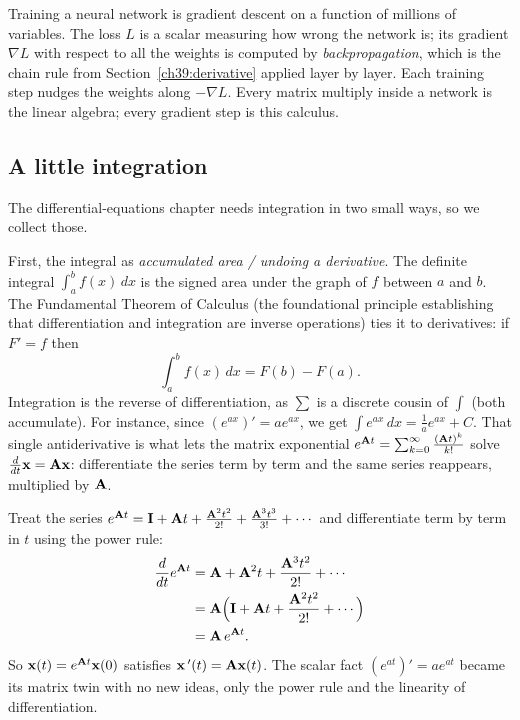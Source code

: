 \begin{applicationbox}
Training a neural network is gradient descent on a function of millions of variables. The loss $L$ is
a scalar measuring how wrong the network is; its gradient $\nabla L$ with respect to all the weights
is computed by \emph{backpropagation}, which is the chain rule from
Section~\ref{ch39:derivative} applied layer by layer. Each training step nudges the weights along
$-\nabla L$. Every matrix multiply inside a network is the
linear algebra; every gradient step is this calculus.
\end{applicationbox}

\subsection{A little integration}
\label{ch39:integration}

The differential-equations chapter needs integration in two small ways, so we collect those.

First, the integral as \emph{accumulated area / undoing a derivative}. The definite integral
$\int_a^b f(x)\,dx$ is the signed area under the graph of $f$ between $a$ and $b$. The Fundamental
Theorem of Calculus (the foundational principle establishing that differentiation and integration are
inverse operations) ties it to derivatives: if $F' = f$ then
\[
\int_a^b f(x)\,dx = F(b) - F(a).
\]
Integration is the reverse of differentiation, as $\sum$ is a discrete cousin of $\int$ (both
accumulate). For instance, since $(e^{ax})' = a e^{ax}$, we get $\int e^{ax}\,dx = \frac1a e^{ax} +
C$. That single antiderivative is what lets the matrix exponential $e^{\mathbf{A}t} = \sum_{k=0}^\infty
\frac{(\mathbf{A}t)^k}{k!}$ solve $\frac{d}{dt}\mathbf{x} = \mathbf{A}\mathbf{x}$: differentiate the series term by
term and the same series reappears, multiplied by $\mathbf{A}$.

\begin{example}
\label{ch39:ex-matexp}
Treat the series $e^{\mathbf{A}t} = \mathbf{I} + \mathbf{A}t + \frac{\mathbf{A}^2 t^2}{2!} + \frac{\mathbf{A}^3
t^3}{3!} + \cdots$ and differentiate term by term in $t$ using the power rule:
\begin{align*}
\frac{d}{dt}e^{\mathbf{A}t} &= \mathbf{A} + \mathbf{A}^2 t + \frac{\mathbf{A}^3 t^2}{2!} + \cdots \\
&= \mathbf{A}\Bigl(\mathbf{I} + \mathbf{A}t + \frac{\mathbf{A}^2 t^2}{2!} + \cdots\Bigr) \\
&= \mathbf{A}\,e^{\mathbf{A}t}.
\end{align*}
So $\mathbf{x}(t) = e^{\mathbf{A}t}\mathbf{x}(0)$ satisfies $\mathbf{x}\,'(t) = \mathbf{A}\mathbf{x}(t)$. The scalar
fact $(e^{at})' = a e^{at}$ became its matrix twin with no new ideas, only the power rule and the
linearity of differentiation.
\end{example}

